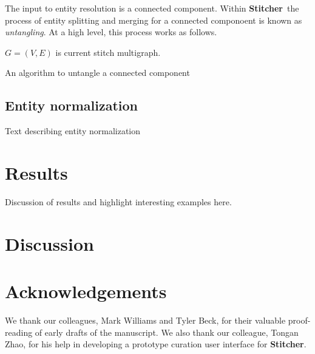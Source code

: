 \documentclass{bioinfo}
\newcommand\st{\textbf{Stitcher}}
\begin{document}
\begin{methods}
The input to entity resolution is a connected component. Within \st\
the process of entity splitting and merging for a connected componoent
is known as \emph{untangling}. At a high level, this process works as
follows. 

\begin{algorithm}\label{algo:untangle}
\SetAlgoLined
\DontPrintSemicolon
$G=(V,E)$ is current stitch multigraph.\\
 \caption{An algorithm to untangle a connected component}
\end{algorithm}


\subsection{Entity normalization}
Text describing entity normalization

\end{methods}

\section{Results}
Discussion of results and highlight interesting examples here.

\section{Discussion}

\section*{Acknowledgements}
We thank our colleagues, Mark Williams and Tyler Beck, for their
valuable proof-reading of early drafts of the manuscript. We also
thank our colleague, Tongan Zhao, for his help in developing a
prototype curation user interface for \st.


%
%
%
%
%
%
%

\end{document}
